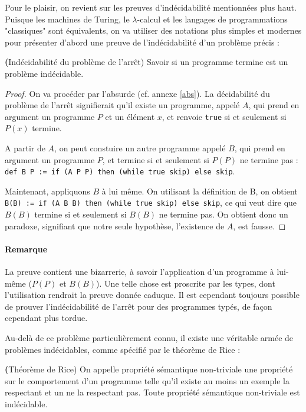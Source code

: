 Pour le plaisir, on revient sur les preuves d'indécidabilité mentionnées plus haut. Puisque les machines de Turing, le $\lambda$-calcul et les langages de programmations "classiques" sont équivalents, on va utiliser des notations plus simples et modernes pour présenter d'abord une preuve de l'indécidabilité d'un problème précis :


\begin{theorem}{\textbf(Indécidabilité du problème de l'arrêt)} Savoir si un programme termine est un problème indécidable.
\end{theorem}

\begin{proof}
On va procéder par l'absurde (cf. annexe \ref{abs}). La décidabilité du problème de l'arrêt signifierait qu'il existe un programme, appelé $A$, qui prend en argument un programme $P$ et un élément $x$, et renvoie \verb!true! si et seulement si $P(x)$ termine.

A partir de $A$, on peut constuire un autre programme appelé $B$, qui prend en argument un programme $P$, et termine si et seulement si $P(P)$ ne termine pas :\\
\verb!def B P := if (A P P) then (while true skip) else skip!.

Maintenant, appliquons $B$ à lui même. On utilisant la définition de B, on obtient\\ \verb!B(B) := if (A B B) then (while true skip) else skip!, ce qui veut dire que $B(B)$ termine si et seulement si $B(B)$ ne termine pas. On obtient donc un paradoxe, signifiant que notre seule hypothèse, l'existence de $A$, est fausse.
\end{proof}

\paragraph{Remarque} La preuve contient une bizarrerie, à savoir l'application d'un programme à lui-même ($P(P)$ et $B(B)$). Une telle chose est proscrite par les types, dont l'utilisation rendrait la preuve donnée caduque. Il est cependant toujours possible de prouver l'indécidabilité de l'arrêt pour des programmes typés, de façon cependant plus tordue.


Au-delà de ce problème particulièrement connu, il existe une véritable armée de problèmes indécidables, comme spécifié par le théorème de Rice :


\begin{theorem}{\textbf(Théorème de Rice)} On appelle propriété sémantique non-triviale une propriété sur le comportement d'un programme telle qu'il existe au moins un exemple la respectant et un ne la respectant pas. Toute propriété sémantique non-triviale est indécidable.
\end{theorem}

